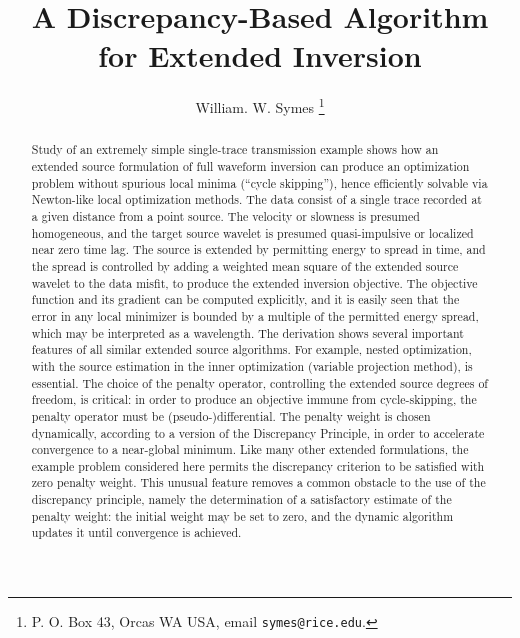 \title{A Discrepancy-Based Algorithm for Extended Inversion}
\author{William. W. Symes \thanks{P. O. Box 43, Orcas WA USA, email {\tt symes@rice.edu}.}}



\maketitle
\begin{abstract}
  Study of an extremely simple single-trace transmission example shows
  how an extended source formulation of full waveform inversion can
  produce an optimization problem without spurious local minima
  (``cycle skipping''), hence efficiently solvable via Newton-like
  local optimization methods. The data consist of a single trace
  recorded at a given distance from a point source. The velocity or
  slowness is presumed homogeneous, and the target source wavelet is
  presumed quasi-impulsive or localized near zero time lag. The source
  is extended by permitting energy to spread in time, and the spread
  is controlled by adding a weighted mean square of the extended
  source wavelet to the data misfit, to produce the extended inversion
  objective. The objective function and its gradient can be computed
  explicitly, and it is easily seen that the error in any local
  minimizer is bounded by a multiple of the permitted energy spread,
  which may be interpreted as a wavelength. The derivation shows several
  important features of all similar extended source algorithms. For
  example, nested optimization, with the source estimation in the
  inner optimization (variable projection method), is essential. The
  choice of the penalty operator, controlling the extended source
  degrees of freedom, is critical: in order to produce an objective
  immune from cycle-skipping, the penalty operator must be
  (pseudo-)differential. The penalty weight is chosen dynamically,
  according to a version of the Discrepancy Principle, in order to
  accelerate convergence to a near-global minimum. Like many other
  extended formulations, the example problem considered here permits
  the discrepancy criterion to be satisfied with zero penalty
  weight. This unusual feature removes a common obstacle to the use of
  the discrepancy principle, namely the determination of a
  satisfactory estimate of the penalty weight: the initial weight may
  be set to zero, and the dynamic algorithm updates it until
  convergence is achieved.

\end{abstract}

